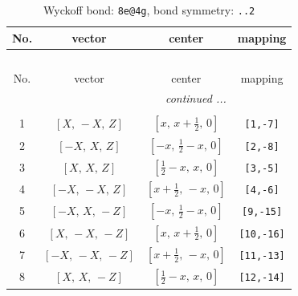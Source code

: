 \documentclass[fleqn,8pt]{jsarticle}
\begin{document}
\begin{longtable}{cccc}
\caption{Wyckoff bond: {\tt 8e@4g}, bond symmetry: {\tt ..2}}
 \\
 \hline \hline
No. & vector & center & mapping \\ \hline \endfirsthead

\multicolumn{3}{l}{\tablename\ \thetable{}} \\
 \hline \hline
No. & vector & center & mapping \\ \hline \endhead

 \hline \hline
\multicolumn{3}{r}{\footnotesize\it continued ...} \\ \endfoot

 \hline \hline
\multicolumn{3}{r}{} \\ \endlastfoot

1 & $\left[ X,\, - X,\, Z \right]$ & $\left[ x,\, x + \frac{1}{2},\, 0 \right]$ & {\tt [1,-7]} \\ \hline
2 & $\left[ - X,\, X,\, Z \right]$ & $\left[ - x,\, \frac{1}{2} - x,\, 0 \right]$ & {\tt [2,-8]} \\ \hline
3 & $\left[ X,\, X,\, Z \right]$ & $\left[ \frac{1}{2} - x,\, x,\, 0 \right]$ & {\tt [3,-5]} \\ \hline
4 & $\left[ - X,\, - X,\, Z \right]$ & $\left[ x + \frac{1}{2},\, - x,\, 0 \right]$ & {\tt [4,-6]} \\ \hline
5 & $\left[ - X,\, X,\, - Z \right]$ & $\left[ - x,\, \frac{1}{2} - x,\, 0 \right]$ & {\tt [9,-15]} \\ \hline
6 & $\left[ X,\, - X,\, - Z \right]$ & $\left[ x,\, x + \frac{1}{2},\, 0 \right]$ & {\tt [10,-16]} \\ \hline
7 & $\left[ - X,\, - X,\, - Z \right]$ & $\left[ x + \frac{1}{2},\, - x,\, 0 \right]$ & {\tt [11,-13]} \\ \hline
8 & $\left[ X,\, X,\, - Z \right]$ & $\left[ \frac{1}{2} - x,\, x,\, 0 \right]$ & {\tt [12,-14]} \\
\end{longtable}
\renewcommand{\arraystretch}{1.2}
\end{document}
